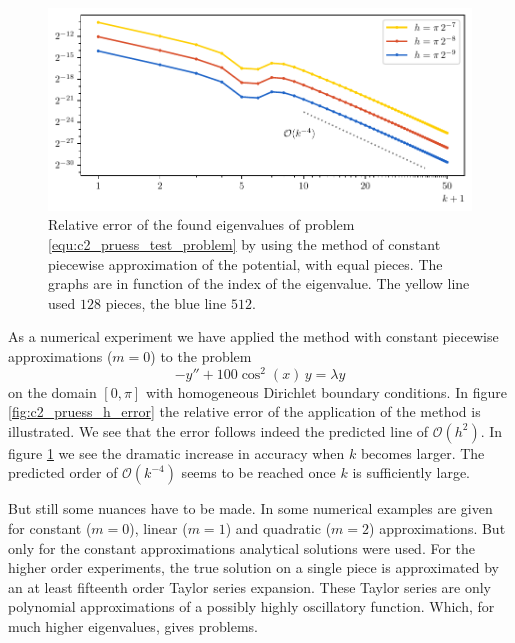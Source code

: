 \begin{figure}
    \begin{center}
        \includegraphics[width=\textwidth]{img/chapter2/pruess_k_error.pdf}
    \end{center}
    \caption{Relative error of the found eigenvalues of problem \eqref{equ:c2_pruess_test_problem} by using the method of constant piecewise approximation of the potential, with equal pieces. The graphs are in function of the index of the eigenvalue. The yellow line used $128$ pieces, the blue line $512$.}
    \label{fig:c2_pruess_k_error}
\end{figure}

As a numerical experiment we have applied the method with constant piecewise approximations ($m=0$) to the problem
\begin{equation}\label{equ:c2_pruess_test_problem}
    -y'' + 100 \cos^2(x) \,y = \lambda y
\end{equation}
on the domain $[0, \pi]$ with homogeneous Dirichlet boundary conditions. In figure \ref{fig:c2_pruess_h_error} the relative error of the application of the method is illustrated. We see that the error follows indeed the predicted line of $\mathcal{O}(h^2)$. In figure \ref{fig:c2_pruess_k_error} we see the dramatic increase in accuracy when $k$ becomes larger. The predicted order of $\mathcal{O}(k^{-4})$ seems to be reached once $k$ is sufficiently large.


But still some nuances have to be made. In \cite{pruess_estimating_1973} some numerical examples are given for constant ($m=0$), linear ($m=1$) and quadratic ($m=2$) approximations. But only for the constant approximations analytical solutions were used. For the higher order experiments, the true solution on a single piece is approximated by an at least fifteenth order Taylor series expansion. These Taylor series are only polynomial approximations of a possibly highly oscillatory function. Which, for much higher eigenvalues, gives problems.


